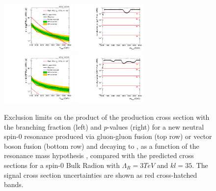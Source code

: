 \begin{figure}[htbp]
  \centering
  \includegraphics[width=0.33\textwidth]{fig/results/limits_RadToWW.pdf}
  \includegraphics[width=0.33\textwidth]{fig/results/pvalue_RadToWW.pdf}\\
  \includegraphics[width=0.33\textwidth]{fig/results/limits_VBFRadToWW.pdf}
  \includegraphics[width=0.33\textwidth]{fig/results/pvalue_VBFRadToWW.pdf}
  \caption{
    Exclusion limits on the product of the production cross section with the branching fraction (left) and $p$-values (right) for a new neutral spin-0 resonance produced via gluon-gluon fusion (top row) or vector boson fusion (bottom row) and decaying to \WW, as a function of the resonance mass hypothesis \MX, compared with the predicted cross sections for a spin-0 Bulk Radion with $\Lambda_{R}=3\unit{TeV}$ and $kl=35$.
    The signal cross section uncertainties are shown as red cross-hatched bands.
  }
  \label{fig:limits_pvalue_spin0}
\end{figure}


